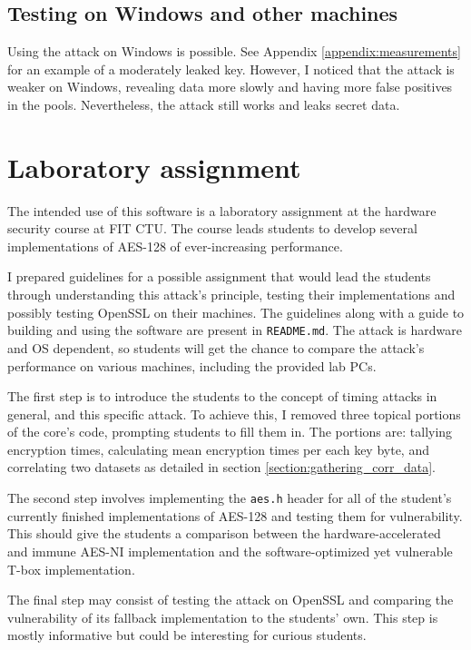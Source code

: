 \documentclass[thesis=B,english]{FITthesis}[2019/03/06]
\begin{document}
\section{Testing on Windows and other machines}
Using the attack on Windows is possible. See Appendix \ref{appendix:measurements} for an example of a moderately leaked key.
However, I noticed that the attack is weaker on Windows, revealing data more slowly and having more false positives in the pools.
Nevertheless, the attack still works and leaks secret data.

\chapter{Laboratory assignment}
The intended use of this software is a laboratory assignment at the hardware security course at FIT CTU.
The course leads students to develop several implementations of AES-128 of ever-increasing performance.

I prepared guidelines for a possible assignment that would lead the students through understanding this attack's principle, testing their implementations and possibly testing OpenSSL on their machines.
The guidelines along with a guide to building and using the software are present in \verb'README.md'.
The attack is hardware and OS dependent, so students will get the chance to compare the attack's performance on various machines, including the provided lab PCs.

The first step is to introduce the students to the concept of timing attacks in general, and this specific attack.
To achieve this, I removed three topical portions of the core's code, prompting students to fill them in.
The portions are: tallying encryption times, calculating mean encryption times per each key byte, and correlating two datasets as detailed in section \ref{section:gathering_corr_data}.

The second step involves implementing the \verb'aes.h' header for all of the student's currently finished implementations of AES-128 and testing them for vulnerability.
This should give the students a comparison between the hardware-accelerated and immune AES-NI implementation and the software-optimized yet vulnerable T-box implementation.

The final step may consist of testing the attack on OpenSSL and comparing the vulnerability of its fallback implementation to the students' own.
This step is mostly informative but could be interesting for curious students.
\end{document}

